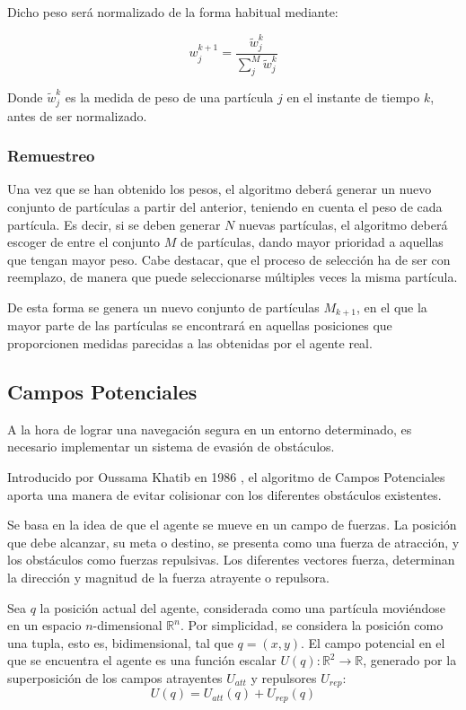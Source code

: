 Dicho peso será normalizado de la forma habitual mediante: 

\begin{equation}
w_j^{k+1}=\frac{\tilde{w}_j^k}{\sum_{j}^M \tilde{w}_j^k}
\end{equation}

Donde $\tilde{w}_j^k$ es la medida de peso de una partícula $j$ en el instante de tiempo $k$, antes de ser normalizado.


\subsubsection{Remuestreo}
Una vez que se han obtenido los pesos, el algoritmo deberá generar un nuevo conjunto de partículas a partir del anterior, teniendo en cuenta el peso de cada partícula. Es decir, si se deben generar $N$ nuevas partículas, el algoritmo deberá escoger de entre el conjunto $M$ de partículas, dando mayor prioridad a aquellas que tengan mayor peso. Cabe destacar, que el proceso de selección ha de ser con reemplazo, de manera que puede seleccionarse múltiples veces la misma partícula. 

De esta forma se genera un nuevo conjunto de partículas $M_{k+1}$, en el que la mayor parte de las partículas se encontrará en aquellas posiciones que proporcionen medidas parecidas a las obtenidas por el agente real.


\subsection{Campos Potenciales}
\label{subsec:PF}
\setcounter{equation}{0}
A la hora de lograr una navegación segura en un entorno determinado, es necesario implementar un sistema de evasión de obstáculos. 

Introducido por Oussama Khatib en 1986 \citep{art:Khatib}, el algoritmo de Campos Potenciales aporta una manera de evitar colisionar con los diferentes obstáculos existentes.

Se basa en la idea de que el agente se mueve en un campo de fuerzas. 
La posición que debe alcanzar, su meta o destino, se presenta como una fuerza de atracción, y los obstáculos como fuerzas repulsivas. 
Los diferentes vectores fuerza, determinan la dirección y magnitud de la fuerza atrayente o repulsora.

Sea $q$ la posición actual del agente, considerada como una partícula moviéndose en un espacio $n$-dimensional $\mathbb{R}^n$. Por simplicidad, se considera la posición como una tupla, esto es, bidimensional, tal que $q = (x,y)$. El campo potencial en el que se encuentra el agente es una función escalar $ U(q):\mathbb{R}^2\rightarrow \mathbb{R} $, generado por la superposición de los campos atrayentes $U_\mathit{att}$ y repulsores $U_\mathit{rep}$:
\begin{equation}
U(q) = U_\mathit{att}(q) + U_\mathit{rep}(q)
\label{equation:Uq}
\end{equation}


